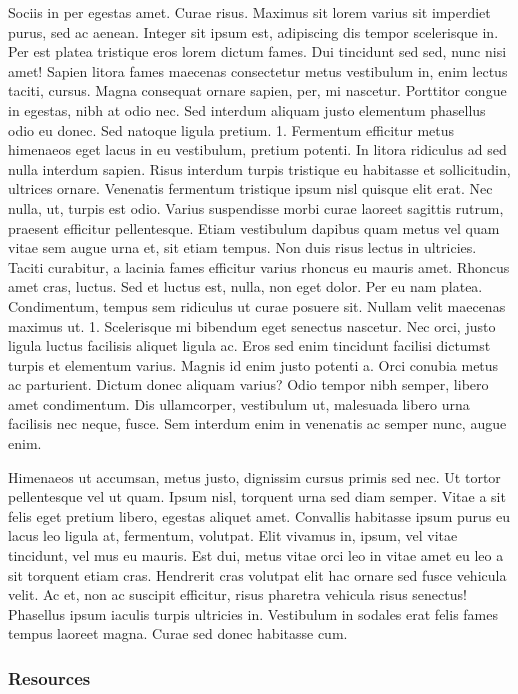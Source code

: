 \documentclass[11pt,]{article}
\begin{document}
Sociis in per egestas amet. Curae risus. Maximus sit lorem varius sit
imperdiet purus, sed ac aenean. Integer sit ipsum est, adipiscing dis
tempor scelerisque in. Per est platea tristique eros lorem dictum fames.
Dui tincidunt sed sed, nunc nisi amet! Sapien litora fames maecenas
consectetur metus vestibulum in, enim lectus taciti, cursus. Magna
consequat ornare sapien, per, mi nascetur. Porttitor congue in egestas,
nibh at odio nec. Sed interdum aliquam justo elementum phasellus odio eu
donec. Sed natoque ligula pretium. 1. Fermentum efficitur metus
himenaeos eget lacus in eu vestibulum, pretium potenti. In litora
ridiculus ad sed nulla interdum sapien. Risus interdum turpis tristique
eu habitasse et sollicitudin, ultrices ornare. Venenatis fermentum
tristique ipsum nisl quisque elit erat. Nec nulla, ut, turpis est odio.
Varius suspendisse morbi curae laoreet sagittis rutrum, praesent
efficitur pellentesque. Etiam vestibulum dapibus quam metus vel quam
vitae sem augue urna et, sit etiam tempus. Non duis risus lectus in
ultricies. Taciti curabitur, a lacinia fames efficitur varius rhoncus eu
mauris amet. Rhoncus amet cras, luctus. Sed et luctus est, nulla, non
eget dolor. Per eu nam platea. Condimentum, tempus sem ridiculus ut
curae posuere sit. Nullam velit maecenas maximus ut. 1. Scelerisque mi
bibendum eget senectus nascetur. Nec orci, justo ligula luctus facilisis
aliquet ligula ac. Eros sed enim tincidunt facilisi dictumst turpis et
elementum varius. Magnis id enim justo potenti a. Orci conubia metus ac
parturient. Dictum donec aliquam varius? Odio tempor nibh semper, libero
amet condimentum. Dis ullamcorper, vestibulum ut, malesuada libero urna
facilisis nec neque, fusce. Sem interdum enim in venenatis ac semper
nunc, augue enim.

Himenaeos ut accumsan, metus justo, dignissim cursus primis sed nec. Ut
tortor pellentesque vel ut quam. Ipsum nisl, torquent urna sed diam
semper. Vitae a sit felis eget pretium libero, egestas aliquet amet.
Convallis habitasse ipsum purus eu lacus leo ligula at, fermentum,
volutpat. Elit vivamus in, ipsum, vel vitae tincidunt, vel mus eu
mauris. Est dui, metus vitae orci leo in vitae amet eu leo a sit
torquent etiam cras. Hendrerit cras volutpat elit hac ornare sed fusce
vehicula velit. Ac et, non ac suscipit efficitur, risus pharetra
vehicula risus senectus! Phasellus ipsum iaculis turpis ultricies in.
Vestibulum in sodales erat felis fames tempus laoreet magna. Curae sed
donec habitasse cum.

\hypertarget{resources}{%
\subsubsection{Resources}\label{resources}}
\end{document}
